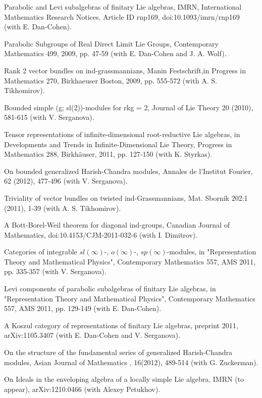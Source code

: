 \myss \label{46.} Parabolic and Levi subalgebras of finitary Lie algebras, IMRN, International Mathematics Research Notices, Article ID rnp169, doi:10.1093/imrn/rnp169 (with E. Dan-Cohen).

\myss \label{47.} Parabolic Subgroups of Real Direct Limit Lie Groups, Contemporary Mathematics 499, 2009, pp. 47-59 (with E. Dan-Cohen and J. A. Wolf).

\myss \label{48.} Rank 2 vector bundles on ind-grassmannians, Manin Festschrift,in Progress in Mathematics 270, Birkhaeuser Boston, 2009, pp. 555-572 (with A. S. Tikhomirov).

\myss \label{49.} Bounded simple (g; sl(2))-modules for rkg = 2, Journal of Lie Theory 20 (2010), 581-615 (with V. Serganova).

\myss \label{50.} Tensor representations of infinite-dimensional root-reductive Lie algebras, in Developments and Trends in Infinite-Dimensional Lie Theory, Progress in Mathematics 288, Birkh\"auser, 2011, pp. 127-150 (with K. Styrkas).

\myss \label{51.} On bounded generalized Harish-Chandra modules, Annales de l'Institut Fourier, 62 (2012), 477-496 (with V. Serganova).

\myss \label{52.} Triviality of vector bundles on twisted ind-Grassmannians, Mat. Sbornik 202:1 (2011), 1-39 (with A. S. Tikhomirov).

\myss \label{53.} A Bott-Borel-Weil theorem for diagonal ind-groups, Canadian Journal of Mathematics, doi:10.4153/CJM-2011-032-6 (with I. Dimitrov).

\myss \label{54.} Categories of integrable $sl(\infty)$-, $o(\infty)$-, $sp(\infty)$-modules, in "Representation Theory and Mathematical Physics", Contemporary Mathematics 557, AMS 2011, pp. 335-357 (with V. Serganova).

\myss \label{55.} Levi components of parabolic subalgebras of finitary Lie algebras, in "Representation Theory and Mathematical Physics", Contemporary Mathematics 557, AMS 2011, pp. 129-149 (with E. Dan-Cohen).

\myss \label{56.} A Koszul category of representations of finitary Lie algebras, preprint 2011, arXiv:1105.3407 (with E. Dan-Cohen and V. Serganova).

\myss \label{57.} On the structure of the fundamental series of generalized Harish-Chandra modules, Asian Journal of Mathematics , 16(2012), 489-514 (with G. Zuckerman).

\myss \label{58.} On Ideals in the enveloping algebra of a locally simple Lie algebra, IMRN (to appear), arXiv:1210.0466 (with Alexey Petukhov).

